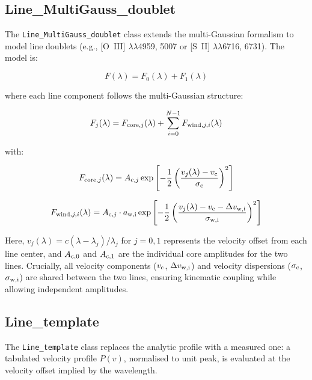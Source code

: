 \documentclass[11pt]{article}
\begin{document}
\subsection{Line\_MultiGauss\_doublet}

The \texttt{Line\_MultiGauss\_doublet} class extends the multi-Gaussian formalism to model line doublets (e.g., [O~III] $\lambda\lambda$4959, 5007 or [S~II] $\lambda\lambda$6716, 6731). The model is:

\begin{equation}
F(\lambda) = F_0(\lambda) + F_1(\lambda)
\end{equation}

where each line component follows the multi-Gaussian structure:

\begin{equation}
F_j(\lambda) = F_{{\rm core},j}(\lambda) + \sum_{i=0}^{N-1} F_{{\rm wind},j,i}(\lambda)
\end{equation}

with:

\begin{equation}
F_{{\rm core},j}(\lambda) = A_{{\rm c},j} \exp\left[-\frac{1}{2}\left(\frac{v_j(\lambda) - v_{\rm c}}{\sigma_{\rm c}}\right)^2\right]
\end{equation}

\begin{equation}
F_{{\rm wind},j,i}(\lambda) = A_{{\rm c},j} \cdot a_{\rm w,i} \exp\left[-\frac{1}{2}\left(\frac{v_j(\lambda) - v_{\rm c} - \Delta v_{\rm w,i}}{\sigma_{\rm w,i}}\right)^2\right]
\end{equation}

Here, $v_j(\lambda) = c(\lambda - \lambda_j)/\lambda_j$ for $j = 0, 1$ represents the velocity offset from each line center, and $A_{{\rm c},0}$ and $A_{{\rm c},1}$ are the individual core amplitudes for the two lines. Crucially, all velocity components ($v_{\rm c}$, $\Delta v_{\rm w,i}$) and velocity dispersions ($\sigma_{\rm c}$, $\sigma_{\rm w,i}$) are shared between the two lines, ensuring kinematic coupling while allowing independent amplitudes.

\subsection{Line\_template}

The \texttt{Line\_template} class replaces the analytic profile with a measured
one: a tabulated velocity profile $P(v)$, normalised to unit peak, is evaluated at
the velocity offset implied by the wavelength.
\end{document}
